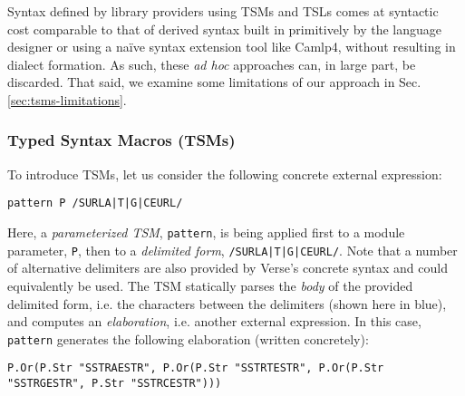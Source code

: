 Syntax defined by library providers using TSMs and TSLs comes at syntactic cost comparable to that of derived syntax built in primitively by the language designer or  using a na\"ive syntax extension tool like Camlp4, without resulting in dialect formation. As such, these \emph{ad hoc} approaches can, in large part, be discarded. That said, we examine some limitations of our approach in Sec. \ref{sec:tsms-limitations}.

\subsubsection{Typed Syntax Macros (TSMs)}\label{sec:tsms}
To introduce TSMs, let us consider the following concrete external expression:
\begin{lstlisting}[numbers=none]
pattern P /SURLA|T|G|CEURL/
\end{lstlisting}
Here, a \emph{parameterized TSM}, \lstinline{pattern}, is being applied first to a module parameter, \lstinline{P}, then to a \emph{delimited form}, \lstinline{/SURLA|T|G|CEURL/}. Note that a number of alternative delimiters are also provided by Verse's concrete syntax and could equivalently be used. The TSM statically parses the \emph{body} of the provided delimited form, i.e. the characters between the delimiters (shown here in blue), and computes an \emph{elaboration}, i.e. another external expression. In this case, \lstinline{pattern} generates the following elaboration (written concretely):

\begin{lstlisting}[numbers=none]
P.Or(P.Str "SSTRAESTR", P.Or(P.Str "SSTRTESTR", P.Or(P.Str "SSTRGESTR", P.Str "SSTRCESTR")))
\end{lstlisting}

